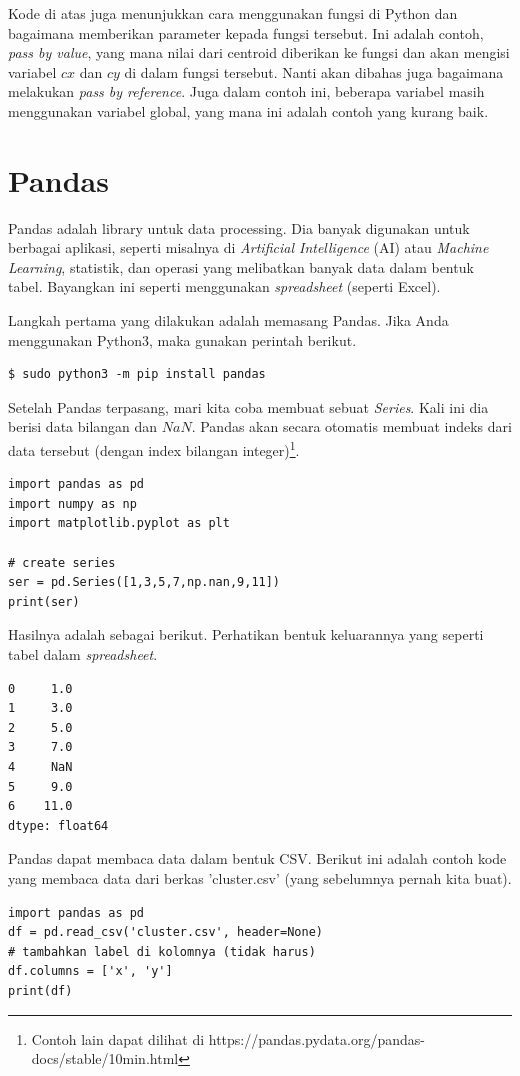 Kode di atas juga menunjukkan cara menggunakan fungsi di Python dan bagaimana
memberikan parameter kepada fungsi tersebut.
Ini adalah contoh, {\em pass by value}, yang mana nilai dari centroid
diberikan ke fungsi dan akan mengisi variabel $cx$ dan $cy$ di dalam fungsi
tersebut.
Nanti akan dibahas juga bagaimana melakukan {\em pass by reference}.
Juga dalam contoh ini, beberapa variabel masih menggunakan variabel global,
yang mana ini adalah contoh yang kurang baik.

\section{Pandas}
Pandas adalah library untuk data processing. Dia banyak digunakan untuk
berbagai aplikasi, seperti misalnya di {\em Artificial Intelligence}
(AI) atau {\em Machine Learning}, statistik, dan operasi yang melibatkan
banyak data dalam bentuk tabel.
Bayangkan ini seperti menggunakan {\em spreadsheet} (seperti Excel).

Langkah pertama yang dilakukan adalah memasang Pandas.
Jika Anda menggunakan Python3, maka gunakan perintah berikut.
\begin{verbatim}
$ sudo python3 -m pip install pandas
\end{verbatim}

Setelah Pandas terpasang, mari kita coba membuat sebuat {\em Series}.
Kali ini dia berisi data bilangan dan $NaN$.
Pandas akan secara otomatis membuat indeks dari data tersebut (dengan
index bilangan integer)\footnote{Contoh lain dapat dilihat di
https://pandas.pydata.org/pandas-docs/stable/10min.html}.

\begin{verbatim}
import pandas as pd
import numpy as np
import matplotlib.pyplot as plt

# create series
ser = pd.Series([1,3,5,7,np.nan,9,11])
print(ser)
\end{verbatim}

Hasilnya adalah sebagai berikut. Perhatikan bentuk keluarannya
yang seperti tabel dalam {\em spreadsheet}.
\begin{verbatim}
0     1.0
1     3.0
2     5.0
3     7.0
4     NaN
5     9.0
6    11.0
dtype: float64
\end{verbatim}

Pandas dapat membaca data dalam bentuk CSV.
Berikut ini adalah contoh kode yang membaca data dari berkas 'cluster.csv'
(yang sebelumnya pernah kita buat).

\begin{verbatim}
import pandas as pd
df = pd.read_csv('cluster.csv', header=None)
# tambahkan label di kolomnya (tidak harus)
df.columns = ['x', 'y']
print(df)
\end{verbatim}


